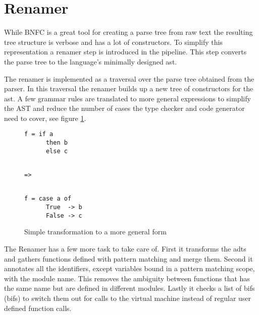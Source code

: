 \section{Renamer}



While BNFC is a great tool for creating a parse tree from raw text the resulting tree structure is verbose and has a lot of constructors. To simplify this representation a renamer step is introduced in the pipeline. This step converts the parse tree to the language's minimally designed \acrshort{ast}. 

The renamer is implemented as a traversal over the parse tree obtained from the parser. In this traversal the renamer builds up a new tree of constructors for the \acrshort{ast}. A few grammar rules are translated to more general expressions to simplify the AST and reduce the number of cases the type checker and code generator need to cover, see figure \ref{lst:renamer1}.

\begin{figure}[ht]
\centering
{}%
\begin{minipage}[b]{0.30\linewidth}
    \centering
    \begin{lstlisting}
f = if a
      then b
      else c
    \end{lstlisting}
\end{minipage}
\begin{minipage}[b]{0.09\linewidth}
    \centering
    \begin{lstlisting}
    
=>
 
    \end{lstlisting}
\end{minipage}
\begin{minipage}[b]{0.30\linewidth}
    \centering
    \begin{lstlisting}
f = case a of
      True  -> b
      False -> c
    \end{lstlisting}
\end{minipage}
\caption{Simple transformation to a more general form}
\label{lst:renamer1}
\end{figure}

The Renamer has a few more task to take care of. First it transforms the \acrshort{adt}s and gathers functions defined with pattern matching and merge them. Second it annotates all the identifiers, except variables bound in a pattern matching scope, with the module name. This removes the ambiguity between functions that has the same name but are defined in different modules. Lastly it checks a list of \acrlong{bif}s (\acrshort{bif}s) to switch them out for calls to the virtual machine instead of regular user defined function calls.

